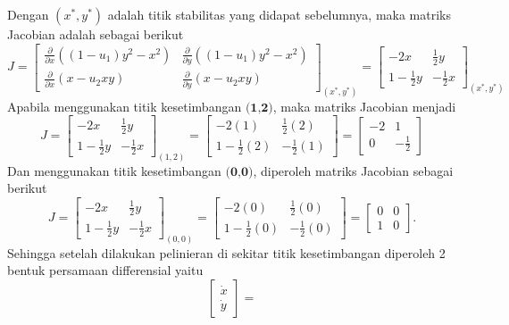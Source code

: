\documentclass{article}
\begin{document}
\begin{enumerate}[label=\alph*.]
\[    \]
    Dengan $(x^*,y^*)$ adalah titik stabilitas yang didapat sebelumnya, maka matriks Jacobian adalah sebagai berikut
    \[
    J = 
    \begin{bmatrix}
    \frac{\partial}{\partial x}\left( (1-u_1)y^2-x^2 \right) & \frac{\partial}{\partial y}\left( (1-u_1)y^2-x^2 \right) \\
    \frac{\partial}{\partial x}\left( x-u_2xy \right) & \frac{\partial}{\partial y}\left( x-u_2xy \right)
    \end{bmatrix}_{(x^*,y^*)} =
    \begin{bmatrix}
    -2x & \frac{1}{2}y \\
    1-\frac{1}{2}y & -\frac{1}{2}x
    \end{bmatrix}_{(x^*,y^*)}
    \]
    Apabila menggunakan titik kesetimbangan $\textbf{(1,2)}$, maka matriks Jacobian menjadi
    \[
    J = 
    \begin{bmatrix}
    -2x & \frac{1}{2}y \\
    1-\frac{1}{2}y & -\frac{1}{2}x
    \end{bmatrix}_{(1,2)}
    = 
    \begin{bmatrix}
    -2(1) & \frac{1}{2}(2) \\
    1-\frac{1}{2}(2) & -\frac{1}{2}(1)
    \end{bmatrix}
    = 
    \begin{bmatrix}
    -2 & 1 \\
    0 & -\frac{1}{2}
    \end{bmatrix}
    \]
    Dan menggunakan titik kesetimbangan $\textbf{(0,0)}$, diperoleh matriks Jacobian sebagai berikut
    \[
    J = 
    \begin{bmatrix}
    -2x & \frac{1}{2}y \\
    1-\frac{1}{2}y & -\frac{1}{2}x
    \end{bmatrix}_{(0,0)}
    = 
    \begin{bmatrix}
    -2(0) & \frac{1}{2}(0) \\
    1-\frac{1}{2}(0) & -\frac{1}{2}(0)
    \end{bmatrix}
    = 
    \begin{bmatrix}
    0 & 0 \\
    1 & 0
    \end{bmatrix}.
    \]
    Sehingga setelah dilakukan pelinieran di sekitar titik kesetimbangan diperoleh 2 bentuk persamaan differensial yaitu
    \[
    \begin{bmatrix}
        \dot{x} \\ \dot{y}
    \end{bmatrix} =
\]
\end{enumerate}
\end{document}
